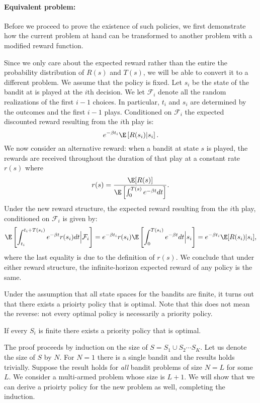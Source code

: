 \paragraph{Equivalent problem:} Before we proceed to prove the existence of such policies, we first demonstrate how the current problem at hand can be transformed to another problem with a modified reward function.

Since we only care about the expected reward rather than the entire the probability distribution of $R(s)$ and $T(s)$, we will be able to convert it to a different problem. We assume that the policy is fixed. Let $s_i$ be the state of the bandit at is played at the $i$th decision. We let $\mathcal{F}_i$ denote all the random realizations of the first $i-1$ choices. In particular, $t_i$ and $s_i$ are determined by the outcomes and the first $i-1$ plays. Conditioned on $\mathcal{F}_i$ the expected discounted reward resulting from the $i$th play is:
$$
e^{-\beta t_i} \E\left[ R(s_i) | s_i \right].
$$
We now consider an alternative reward: when a bandit at state $s$ is played, the rewards are received throughout the duration of that play at a constant rate $r(s)$ where
$$
r(s) = \frac{\E [R(s)]}{\E \left[ \int_0^{T(s)} e^{-\beta t} d t \right]}.
$$
Under the new reward structure, the expected reward resulting from the $i$th play, conditioned on $\mathcal{F}_i$ is given by:
$$
\E \left[ \int_{t_i}^{t_i + T(s_i)} e^{-\beta t}r(s_i)  d  t \Big| \mathcal{F}_i \right] = e^{-\beta t_i} r(s_i)
\E \left[ \int_{0}^{T(s_i)} e^{-\beta t}  d  t \Big| s_i \right] = e^{-\beta t_i} \E[R(s_i)|s_i],
$$
where the last equality is due to the definition of $r(s)$. We conclude that under either reward structure, the infinite-horizon expected reward of any policy is the same.

Under the assumption that all state spaces for the bandits are finite, it turns out that there exists a prioirty policy that is optimal. Note that this does not mean the reverse: not every optimal policy is necessarily a priority policy.

\begin{theorem}\label{th:2.1inTsitsiklis}
If every $S_i$ is finite there exists a priority policy that is optimal.
\end{theorem}
\proof
The proof proceeds by induction on the size of $S=S_1 \cup S_2 \cdots S_K$. Let us denote the size of $S$ by $N$.
For $N=1$ there is a single bandit and the results holds trivially.
Suppose the result holds for {\em all} bandit problems of size $N=L$ for some $L$. We consider a multi-armed problem whose size is $L+1$. We will show that we can derive a prioirty policy for the new problem as well, completing the induction.

